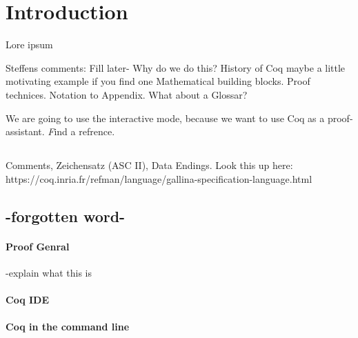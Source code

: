 
\section{Introduction}

Lore ipsum \cite{PACGGHSY}

Steffens comments:
Fill later-
 Why do we do this?
 History of Coq
 maybe a little motivating example if you find one
 Mathematical building blocks. Proof technices. Notation to Appendix.
 What about a Glossar?

We are going to use the interactive mode, because we want to use Coq as a proof-assistant. {\emph Find a refrence.}

\subsection{}

Comments, Zeichensatz (ASC II), Data Endings.
Look this up here:\\
https://coq.inria.fr/refman/language/gallina-specification-language.html
\subsection{-forgotten word-}



\paragraph{Proof Genral}
-explain what this is


\paragraph{Coq IDE}

\paragraph{Coq in the command line}




